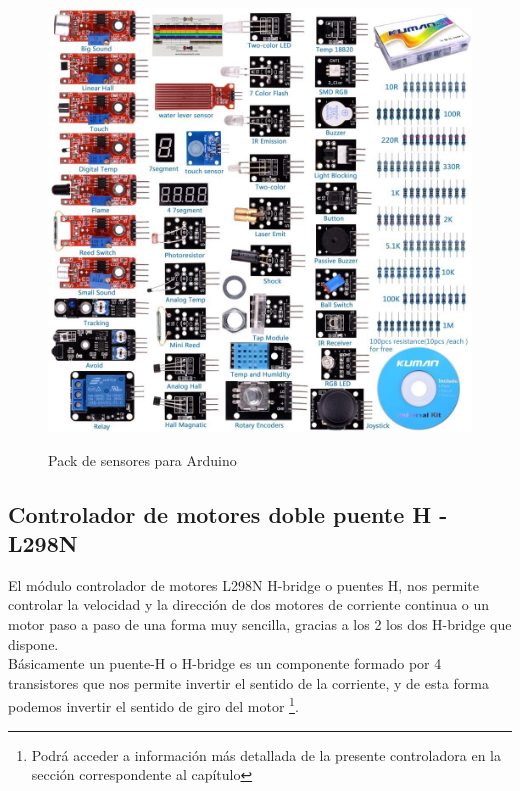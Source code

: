 \begin{figure}[H]
  \begin{center}
    \includegraphics[scale=0.35]{imagenes/arduino_sensor_kit.jpg}\\
    \caption{Pack de sensores para Arduino}
  \end{center}
\end{figure}

\subsection{Controlador de motores doble puente H - L298N}


El módulo controlador de motores L298N H-bridge o puentes H, nos permite controlar la velocidad y la dirección de dos motores de corriente continua o un motor paso a paso de una forma muy sencilla,
gracias a los 2 los dos H-bridge que dispone.\\

Básicamente un puente-H o H-bridge es un componente formado por 4 transistores que nos permite invertir el sentido de la corriente, y de esta forma podemos 
invertir el sentido de giro del motor \footnote{Podrá acceder a información más detallada de la presente controladora en la sección correspondente al capítulo }.\\

